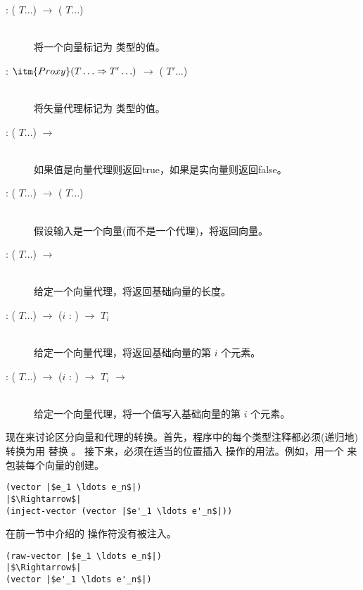 \documentclass[11pt]{book}
\begin{document}
\begin{description}
\item[ : ( $T \ldots$) $\to$
  ( $T \ldots$)]\ \\
%
  将一个向量标记为  类型的值。
\item[ : $\itm{Proxy}(T\ldots \Rightarrow T'\ldots)$
  $\to$ ( $T' \ldots$)]\ \\
%
  将矢量代理标记为  类型的值。
\item[ : ( $T \ldots$) $\to$
  ] \ \\
%
  如果值是向量代理则返回true，如果是实向量则返回false。
\item[ : ( $T \ldots$) $\to$
  ( $T \ldots$)]\ \\
%
  假设输入是一个向量(而不是一个代理)，将返回向量。
  
\item[ : ( $T \ldots$)
  $\to$ ]\ \\
%
  给定一个向量代理，将返回基础向量的长度。
  
\item[ : ( $T \ldots$)
  $\to$ ($i$ : ) $\to$ $T_i$]\ \\
%
  给定一个向量代理，将返回基础向量的第 $i$ 个元素。
  
\item[ : ( $T \ldots$) $\to$ ($i$
  : ) $\to$ $T_i$ $\to$ ]\ \\ 给定一个向量代理，将一个值写入基础向量的第 $i$ 个元素。
\end{description}

现在来讨论区分向量和代理的转换。首先，程序中的每个类型注释都必须(递归地)转换为用  替换  。
接下来，必须在适当的位置插入  操作的用法。例如，用一个
 来包装每个向量的创建。
\begin{lstlisting}
(vector |$e_1 \ldots e_n$|)
|$\Rightarrow$|
(inject-vector (vector |$e'_1 \ldots e'_n$|))
\end{lstlisting}
在前一节中介绍的  操作符没有被注入。
\begin{lstlisting}
(raw-vector |$e_1 \ldots e_n$|)
|$\Rightarrow$|
(vector |$e'_1 \ldots e'_n$|)
\end{lstlisting}
\end{document}
